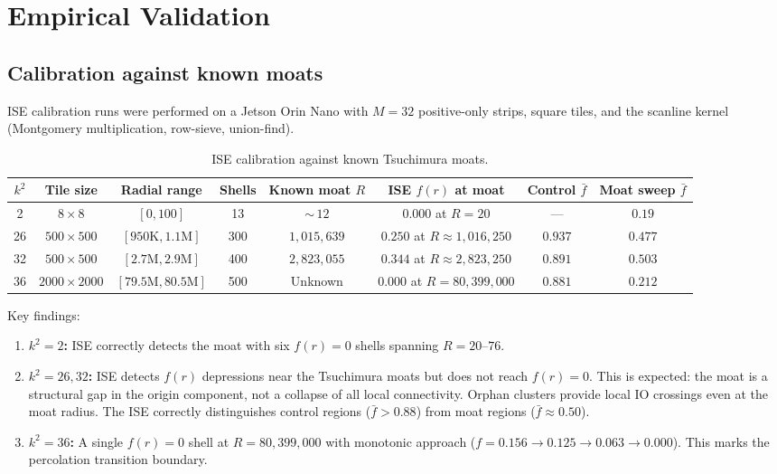 \documentclass[11pt,a4paper]{article}
\newcommand{\fr}{f(r)}
\theoremstyle{definition}
\theoremstyle{plain}
\theoremstyle{remark}
\begin{document}
\section{Empirical Validation}\label{sec:validation}

\subsection{Calibration against known moats}

ISE calibration runs were performed on a Jetson Orin Nano with $M = 32$ positive-only strips, square tiles, and the scanline kernel (Montgomery multiplication, row-sieve, union-find).

\begin{table}[ht]
\centering
\small
\begin{tabular}{@{}cccccccc@{}}
\toprule
$k^2$ & Tile size & Radial range & Shells & Known moat $R$ & ISE $\fr$ at moat & Control $\bar{f}$ & Moat sweep $\bar{f}$ \\
\midrule
2  & $8 \times 8$       & $[0, 100]$                     & 13  & ${\sim}\,12$      & $0.000$ at $R{=}20$       & ---    & $0.19$ \\
26 & $500 \times 500$   & $[950\text{K}, 1.1\text{M}]$   & 300 & $1{,}015{,}639$   & $0.250$ at $R{\approx}1{,}016{,}250$ & $0.937$ & $0.477$ \\
32 & $500 \times 500$   & $[2.7\text{M}, 2.9\text{M}]$   & 400 & $2{,}823{,}055$   & $0.344$ at $R{\approx}2{,}823{,}250$ & $0.891$ & $0.503$ \\
36 & $2000 \times 2000$ & $[79.5\text{M}, 80.5\text{M}]$ & 500 & Unknown           & $\mathbf{0.000}$ at $R{=}80{,}399{,}000$ & $0.881$ & $0.212$ \\
\bottomrule
\end{tabular}
\caption{ISE calibration against known Tsuchimura moats.}
\label{tab:calibration}
\end{table}

Key findings:
\begin{enumerate}
  \item \textbf{$k^2 = 2$:}  ISE correctly detects the moat with six $\fr = 0$ shells spanning $R = 20$--$76$.
  \item \textbf{$k^2 = 26, 32$:}  ISE detects $\fr$ depressions near the Tsuchimura moats but does not reach $\fr = 0$.  This is expected: the moat is a structural gap in the origin component, not a collapse of all local connectivity.  Orphan clusters provide local IO crossings even at the moat radius.  The ISE correctly distinguishes control regions ($\bar{f} > 0.88$) from moat regions ($\bar{f} \approx 0.50$).
  \item \textbf{$k^2 = 36$:}  A single $\fr = 0$ shell at $R = 80{,}399{,}000$ with monotonic approach ($f = 0.156 \to 0.125 \to 0.063 \to 0.000$).  This marks the percolation transition boundary.
\end{enumerate}
\end{document}
